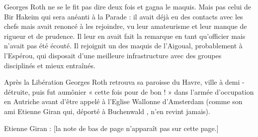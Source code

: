 Georges Roth ne se le fit pas dire deux fois et gagna le maquis. Mais pas celui de Bir Hakeim
qui sera anéanti à la Parade : il avait déjà eu des contacts avec les chefs mais avait renoncé à
les rejoindre, vu leur amateurisme et leur manque de rigueur et de prudence. Il leur en avait
fait la remarque en tant qu’officier mais n’avait pas été écouté.
Il rejoignit un des maquis de l’Aigoual, probablement à l’Espérou, qui disposait d’une
meilleure infrastructure avec des groupes disciplinés et mieux entraînés.

Après la Libération Georges Roth retrouva sa paroisse du Havre, ville à demi - détruite, puis
fut aumônier « cette fois pour de bon ! » dans l’armée d’occupation en Autriche avant d’être
appelé à l’Eglise Wallonne d’Amsterdam (comme son ami Etienne Giran qui, déporté à
Buchenwald , n’en revint jamais).

\bigskip

\noindent * Etienne Giran : [la note de bas de page n’apparaît pas sur cette page.]
